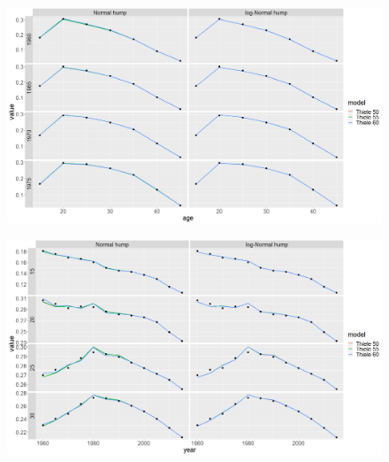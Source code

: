 \documentclass[12pt,a4paper]{article}
\begin{document}
\newpage
\begin{figure}[H]
\includegraphics[width = \linewidth]{fert.png}
\end{figure}
\begin{figure}[H]
\includegraphics[width = \linewidth]{age fert.png}
\end{figure}
\end{document}

